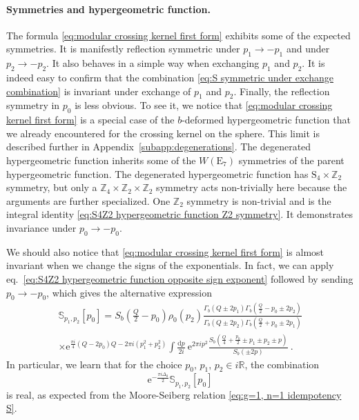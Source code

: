 \documentclass[12pt,a4paper]{article}
\newcommand{\be}{\begin{equation}}
\newcommand{\ee}{\end{equation}}
\renewcommand\d{\text{d}}
\newcommand\ZZ{\mathbb{Z}}
\newcommand\RR{\mathbb{R}}
\begin{document}
\paragraph{Symmetries and hypergeometric function.} The formula \eqref{eq:modular crossing kernel first form} exhibits some of the expected symmetries. It is manifestly reflection symmetric under $p_1 \to -p_1$ and under $p_2 \to -p_2$. It also behaves in a simple way when exchanging $p_1$ and $p_2$. It is indeed easy to confirm that the combination \eqref{eq:S symmetric under exchange combination} is invariant under exchange of $p_1$ and $p_2$. Finally, the reflection symmetry in $p_0$ is less obvious. 
To see it, we notice that \eqref{eq:modular crossing kernel first form} is a special case of the $b$-deformed hypergeometric function that we already encountered for the crossing kernel on the sphere. This limit is described further in Appendix~\ref{subapp:degenerations}. The degenerated hypergeometric function inherits some of the $W(\mathrm{E}_7)$ symmetries of the parent hypergeometric function.
The degenerated hypergeometric function has $\mathrm{S}_4 \times \ZZ_2$ symmetry, but only a $\ZZ_4 \times \ZZ_2 \times \ZZ_2$ symmetry acts non-trivially here because the arguments are further specialized.
One $\ZZ_2$ symmetry is non-trivial and is the integral identity \eqref{eq:S4Z2 hypergeometric function Z2 symmetry}. It demonstrates invariance under $p_0 \to -p_0$.

We should also notice that \eqref{eq:modular crossing kernel first form} is almost invariant when we change the signs of the exponentials. In fact, we can apply eq.~\eqref{eq:S4Z2 hypergeometric function opposite sign exponent} followed by sending $p_0 \to -p_0$, which gives the alternative expression
\begin{multline}
    \mathbb{S}_{p_1,p_2}[p_0]=S_b(\tfrac{Q}{2}-p_0) \rho_0(p_2) \frac{\Gamma_b(Q \pm 2 p_1) \Gamma_b(\frac{Q}{2}-p_0 \pm 2p_2)}{\Gamma_b(Q \pm 2 p_2) \Gamma_b(\frac{Q}{2}+ p_0 \pm 2 p_1)}\\
    \times \mathrm{e}^{\frac{\pi i}{4}(Q-2p_0)Q-2\pi i(p_1^2+p_2^2)} \int \frac{\d p}{2i}\ \mathrm{e}^{2\pi i p^2} \frac{S_b(\frac{Q}{4}+\frac{p_0}{2} \pm p_1 \pm p_2 \pm p)}{S_b(\pm 2p)}\ . 
\end{multline}
In particular, we learn that for the choice $p_0,\, p_1 ,\, p_2 \in i \RR$, the combination
\be 
\mathrm{e}^{-\frac{\pi i \Delta_0}{2}} \mathbb{S}_{p_1,p_2}[p_0]
\ee
is real, as expected from the Moore-Seiberg relation \eqref{eq:g=1, n=1 idempotency S}.
\end{document}
